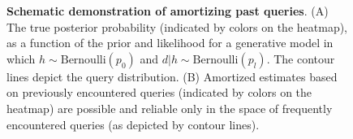 \begin{figure}
\centering
  \caption{\textbf{Schematic demonstration of amortizing past queries}. (A) The true posterior probability (indicated by colors on the heatmap), as a function of the prior and likelihood for a generative model in which $h \sim \text{Bernoulli}(p_0)$ and $d|h \sim \text{Bernoulli}(p_l)$. The contour lines depict the query distribution. (B) Amortized estimates based on previously encountered queries (indicated by colors on the heatmap) are possible and reliable only in the space of frequently encountered queries (as depicted by contour lines).} 
  \label{fig:ecol_ration_schematic}
\end{figure}

